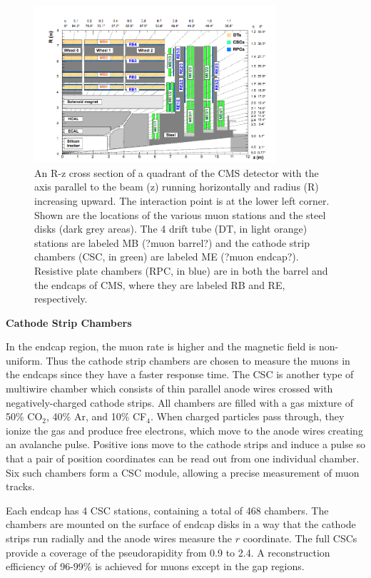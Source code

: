 \documentclass[thesis.tex]{subfiles}
\begin{document}
\begin{figure}[hbtp]
	\centering
	\includegraphics[width=0.8\textwidth]{plot/DT.png}
	\caption{An R-z cross section of a quadrant of the CMS detector with the axis parallel to the beam (z) running horizontally and radius (R) increasing upward.  The interaction point is at the lower left corner. 
	 Shown are the locations of the various muon stations and the steel disks (dark grey areas). The 4 drift tube (DT, in light orange) stations are labeled MB (?muon barrel?) and the cathode strip chambers (CSC, in green) are labeled ME (?muon endcap?).              Resistive plate chambers (RPC, in blue) are in both the barrel and the endcaps of CMS, where they are labeled RB and RE, respectively.}
	\label{fig:DT}
\end{figure}

\noindent \textbf{Cathode Strip Chambers}

In the endcap region, the muon rate is higher and the magnetic field is non-uniform.
Thus the cathode strip chambers are chosen to measure the muons in the endcaps since they have a faster response time. 
The CSC is another type of multiwire chamber which consists of thin parallel anode wires crossed with negatively-charged cathode strips.
All chambers are filled with a gas mixture of 50\% CO$_2$, 40\% Ar, and 10\% CF$_4$.
When charged particles pass through, they ionize the gas and produce free electrons, which move to the anode wires creating an avalanche pulse.
Positive ions move to the cathode strips and induce a pulse so that a pair of position coordinates can be read out from one individual chamber.
Six such chambers form a CSC module, allowing a precise measurement of muon tracks. 

Each endcap has 4 CSC stations, containing a total of 468 chambers.
The chambers are mounted on the surface of endcap disks in a way that the cathode strips run radially and the anode wires measure the $r$ coordinate. 
The full CSCs provide a coverage of the pseudorapidity from 0.9 to 2.4.
A reconstruction efficiency of 96-99\% is achieved for muons except in the gap regions.
\end{document}
